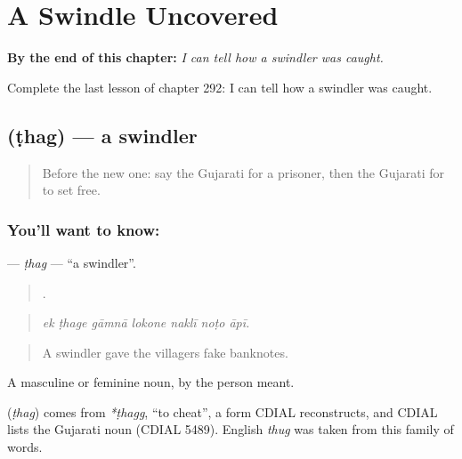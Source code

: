 
\chapter{A Swindle Uncovered}
\label{ch:gu-a-swindle-uncovered}

\begin{chapteropening}
\textbf{By the end of this chapter:} \emph{I can tell how a swindler was caught.}

Complete the last lesson of chapter 292: I can tell how a swindler was caught.
\end{chapteropening}

\section[\texorpdfstring{\gu{ઠગ} (ṭhag)}{ઠગ (ṭhag)}]{ (ṭhag) — a swindler}

\label{lesson:GU-C292-thag}



\begin{quote}
Before the new one: say the Gujarati for a prisoner, then the Gujarati for to set free.
\end{quote}

\subsection*{You'll want to know: }
\textbf{} — \emph{ṭhag} — \textquotedblleft{}a swindler\textquotedblright{}.

\begin{quote}
      .
\end{quote}

\begin{quote}
\emph{ek ṭhage gāmnā lokone naklī noṭo āpī.}
\end{quote}

\begin{quote}
A swindler gave the villagers fake banknotes.
\end{quote}

A masculine or feminine noun, by the person meant.

\begin{cousinweb}
\textbf{} (\emph{ṭhag}) comes from \emph{*ṭhagg}, \textquotedblleft{}to cheat\textquotedblright{}, a form CDIAL reconstructs, and CDIAL lists the Gujarati noun (CDIAL 5489). English \emph{thug} was taken from this family of words.
\end{cousinweb}


